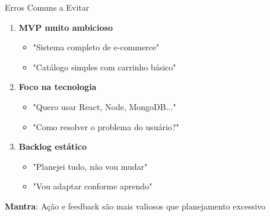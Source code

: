 \documentclass[10pt]{beamer}
\begin{document}
\begin{frame}{Erros Comuns a Evitar}
\begin{enumerate}
    \item \textbf{MVP muito ambicioso}
    \begin{itemize}
        \item[\ding{55}] "Sistema completo de e-commerce"
        \item[\checkmark] "Catálogo simples com carrinho básico"
    \end{itemize}
    
    \item \textbf{Foco na tecnologia}
    \begin{itemize}
        \item[\ding{55}] "Quero usar React, Node, MongoDB..."
        \item[\checkmark] "Como resolver o problema do usuário?"
    \end{itemize}
    
    \item \textbf{Backlog estático}
    \begin{itemize}
        \item[\ding{55}] "Planejei tudo, não vou mudar"
        \item[\checkmark] "Vou adaptar conforme aprendo"
    \end{itemize}
\end{enumerate}

\vspace{0.3cm}
\textbf{Mantra}: Ação e feedback são mais valiosos que planejamento excessivo
\end{frame}
\end{document}
